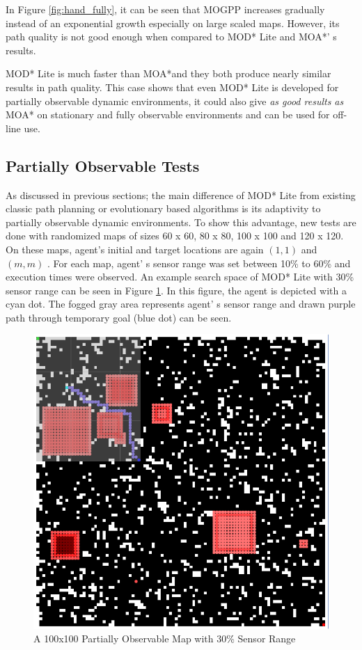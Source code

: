 \documentclass[10pt,journal]{IEEEtran}
\begin{document}
In Figure \ref{fig:hand_fully}, it can be seen that MOGPP increases gradually instead of an exponential growth especially on large scaled maps. However, its path quality is not good enough when compared to MOD* Lite and MOA*' s results.

MOD* Lite is much faster than MOA*and they both produce nearly similar results in path quality. This case shows that even MOD* Lite is developed for partially observable dynamic environments, it could also give \textit{as good results as} MOA* on stationary and fully observable environments and can be used for off-line use.

\subsection{Partially Observable Tests}

As discussed in previous sections; the main difference of MOD* Lite from existing classic path planning or evolutionary based algorithms is its adaptivity to partially observable dynamic environments. To show this advantage, new tests are done with randomized maps of sizes 60 x 60, 80 x 80, 100 x 100 and 120 x 120. On these maps, agent's initial and target locations are again $(1, 1)$ and $(m, m)$ . For each map, agent' s sensor range was set between 10\% to 60\% and execution times were observed. An example search space of MOD* Lite with 30\% sensor range can be seen in Figure \ref{fig:initialSearch}. In this figure, the agent is depicted with a cyan dot. The fogged gray area represents agent' s sensor range and drawn purple path through temporary goal (blue dot) can be seen.

\begin{figure}
\centering
\includegraphics[scale=0.3]{experimental/initialSearch}
\caption{A 100x100 Partially Observable Map with 30\% Sensor Range}
\label{fig:initialSearch}
\end{figure}
\end{document}
